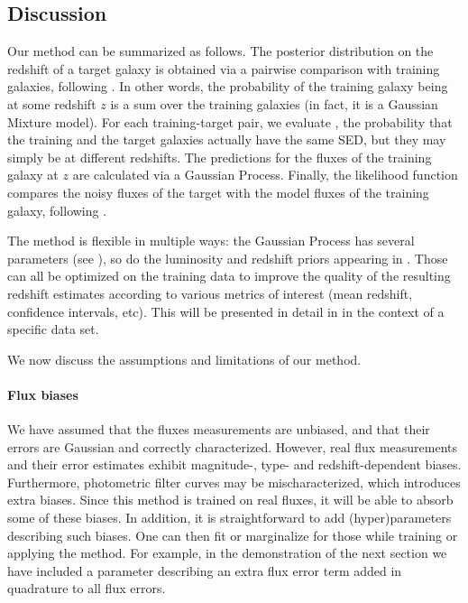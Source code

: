 \documentclass[aps,prd,showpacs,superscriptaddress,groupedaddress]{revtex4}  %
\begin{document}
\subsection{Discussion}\label{sec:discussion}

Our method can be summarized as follows.
The posterior distribution on the redshift of a target galaxy is obtained via a pairwise comparison with training galaxies, following . 
In other words, the probability of the training galaxy being at some redshift $z$ is a sum over the training galaxies (in fact, it is a Gaussian Mixture model).
For each training-target pair, we evaluate , the probability that the training and the target galaxies actually have the same SED, but they may simply be at different redshifts.
The predictions for the fluxes of the training galaxy at $z$ are calculated via a Gaussian Process. 
Finally, the likelihood function compares the noisy fluxes of the target with the model fluxes of the training galaxy, following .

The method is flexible in multiple ways: the Gaussian Process has several parameters (see ), so do the luminosity and redshift priors appearing in .
Those can all be optimized on the training data to improve the quality of the resulting redshift estimates according to various metrics of interest (\eg mean redshift, confidence intervals, etc).
This will be presented in detail in  in the context of a specific data set.

\smallskip
We now discuss the assumptions and limitations of our method.
\smallskip

\paragraph{Flux biases} 
We have assumed that the fluxes measurements are unbiased, and that their errors are Gaussian and correctly characterized.
However, real flux measurements and their error estimates exhibit magnitude-, type- and redshift-dependent biases.
Furthermore, photometric filter curves may be mischaracterized, which introduces extra biases.
Since this method is trained on real fluxes, it will be able to absorb some of these biases. 
In addition, it is straightforward to add (hyper)parameters describing such biases.
One can then fit or marginalize for those while training or applying the method.
For example, in the demonstration of the next section we have included a parameter describing an extra flux error term added in quadrature to all flux errors.
\end{document}
